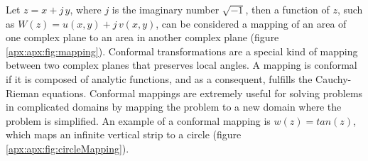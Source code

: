   \par Let $z = x + j\,y$, where $j$ is the imaginary number $\sqrt{-1}$, then a function of $z$, such as $W(z) = u(x,y) + j\,v(x,y)$, can be considered a mapping of an area of one complex plane to an area in another complex plane (figure \ref{apx:apx:fig:mapping}). Conformal transformations are a special kind of mapping between two complex planes that preserves local angles. A mapping is conformal if it is composed of analytic functions, and as a consequent, fulfills the Cauchy-Rieman equations. Conformal mappings are extremely useful for solving problems in complicated domains by mapping the problem to a new domain where the problem is simplified. An example of a conformal mapping is $w(z) = tan(z)$, which maps an infinite vertical strip to a circle (figure \ref{apx:apx:fig:circleMapping}). 

